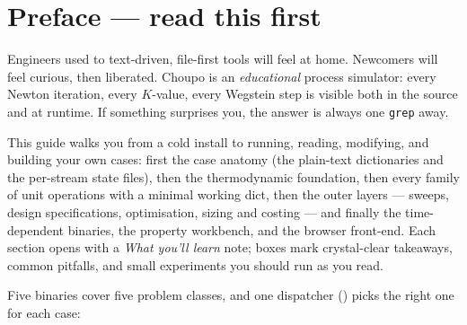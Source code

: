 \documentclass[11pt,a4paper]{article}
\title{}
\author{}
\date{}
\begin{document}

\setcounter{tocdepth}{2}
\tableofcontents
\clearpage
{}
\setcounter{page}{1}

\section*{Preface --- read this first}

Engineers used to text-driven, file-first tools will feel at home.
Newcomers will feel curious, then liberated.  Choupo is an
\emph{educational} process simulator: every Newton iteration, every
$K$-value, every Wegstein step is visible both in the source and at
runtime.  If something surprises you, the answer is always one
\texttt{grep} away.

This guide walks you from a cold install to running, reading, modifying,
and building your own cases: first the case anatomy (the plain-text
dictionaries and the per-stream state files), then the thermodynamic
foundation, then every family of unit operations with a minimal working
dict, then the outer layers --- sweeps, design specifications,
optimisation, sizing and costing --- and finally the time-dependent
binaries, the property workbench, and the browser front-end.  Each
section opens with a \emph{What you'll learn} note; boxes mark
crystal-clear takeaways, common pitfalls, and small experiments you
should run as you read.

Five binaries cover five problem classes, and one dispatcher
() picks the right one for each case:
\end{document}
